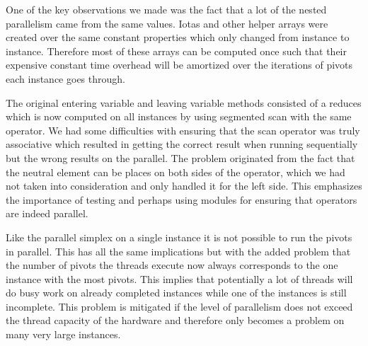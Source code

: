 One of the key observations we made was the fact that a lot of the nested parallelism came from the same values. Iotas and other helper arrays were created over the same constant properties which only changed from instance to instance. Therefore most of these arrays can be computed once such that their expensive constant time overhead will be amortized over the iterations of pivots each instance goes through.

The original entering variable and leaving variable methods consisted of a reduces which is now computed on all instances by using segmented scan with the same operator. We had some difficulties with ensuring that the scan operator was truly associative which resulted in getting the correct result when running sequentially but the wrong results on the parallel. The problem originated from the fact that the neutral element can be places on both sides of the operator, which we had not taken into consideration and only handled it for the left side. This emphasizes the importance of testing and perhaps using modules for ensuring that operators are indeed parallel.

Like the parallel simplex on a single instance it is not possible to run the pivots in parallel. This has all the same implications but with the added problem that the number of pivots the threads execute now always corresponds to the one instance with the most pivots. This implies that potentially a lot of threads will do busy work on already completed instances while one of the instances is still incomplete. This problem is mitigated if the level of parallelism does not exceed the thread capacity of the hardware and therefore only becomes a problem on many very large instances.
